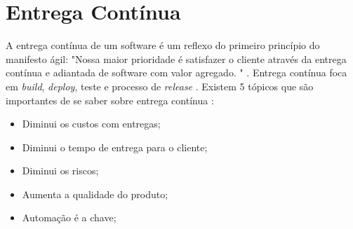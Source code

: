 \section{Entrega Contínua}

A entrega contínua de um software é um reflexo do primeiro princípio do manifesto ágil: "Nossa maior prioridade é satisfazer o cliente através da entrega contínua e adiantada de software com valor agregado. " \cite{manifesto}. Entrega contínua foca em \textit{build}, \textit{deploy}, teste e processo de \textit{release} \cite{livro-deploy-continuo}.
Existem 5 tópicos que são importantes de se saber sobre entrega contínua \cite{network-world}:
\begin{itemize}
    \item Diminui os custos com entregas;
    \item Diminui o tempo de entrega para o cliente;
    \item Diminui os riscos;
    \item Aumenta a qualidade do produto;
    \item Automação é a chave;
\end{itemize}
